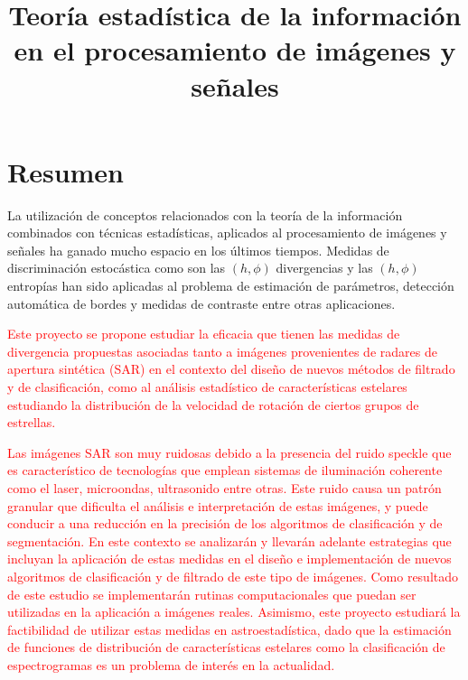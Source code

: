 \documentclass[11pt]{article}
\title{\textbf{Teoría estadística de la información \\en el procesamiento de imágenes y señales}}
\date{}
\begin{document}
	
	\maketitle

\section{Resumen}
La utilización de conceptos relacionados con la teoría de la información combinados con técnicas estadísticas, aplicados al procesamiento de imágenes y señales ha ganado mucho espacio en los últimos tiempos. Medidas de discriminación estocástica como son las $(h,\phi)$ divergencias y las $(h,\phi)$ entropías han sido aplicadas al problema de estimación de parámetros, detección automática de bordes y medidas de contraste entre otras aplicaciones. 

\textcolor{red}{Este proyecto se propone estudiar la eficacia que tienen las medidas de divergencia propuestas asociadas tanto a imágenes provenientes de radares de apertura sintética (SAR) en el contexto del diseño de nuevos métodos de filtrado y de clasificación, como al análisis estadístico de características estelares estudiando la distribución de la velocidad de rotación de ciertos grupos de estrellas. }


\textcolor{red}{Las imágenes SAR son muy ruidosas debido a la presencia del ruido speckle que es característico de tecnologías que emplean sistemas de iluminación coherente como el laser, microondas, ultrasonido entre otras. Este ruido causa un patrón granular que dificulta el análisis e interpretación de estas imágenes, y puede conducir a una reducción en la precisión de los algoritmos de clasificación y de segmentación. }
\textcolor{red}{
En este contexto se analizarán y llevarán adelante estrategias que incluyan la aplicación de estas medidas en el diseño e implementación de nuevos algoritmos de clasificación y de filtrado de este tipo de imágenes. Como resultado de este estudio se implementarán rutinas computacionales que puedan ser utilizadas en la aplicación a imágenes reales.}
\textcolor{red}{
Asimismo, este proyecto estudiará la factibilidad de utilizar estas medidas en astroestadística,  dado que la estimación de funciones de distribución de características estelares como la clasificación de espectrogramas es un problema de interés en la actualidad. }



\end{document}
